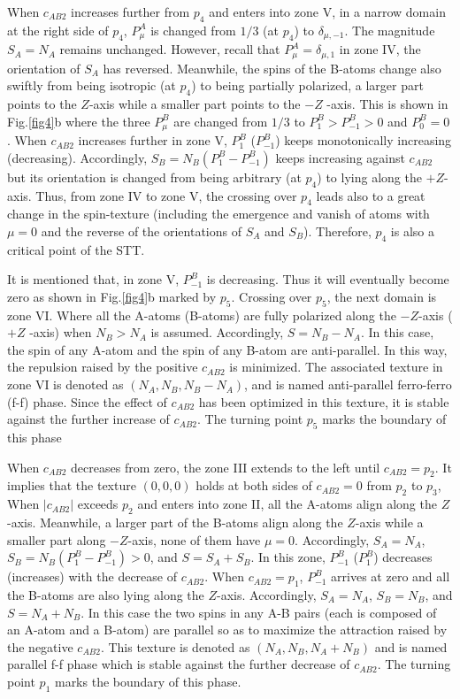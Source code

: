 \documentclass[10pt]{wlscirep}
\begin{document}
When $c_{AB2}$ increases further from $p_{4}$ and enters into
zone V, in a narrow domain at the right side of $p_{4}$, $%
P_{\mu }^{A}$ is changed from $1/3$ (at $p_{4}$) to $\delta
_{\mu ,-1}$. The magnitude $S_{A}=N_{A}$ remains unchanged. However, recall
that $P_{\mu }^{A}=\delta _{\mu ,1}$ in zone IV, the orientation of $S_{A}$
has reversed. Meanwhile, the spins of the B-atoms change also swiftly from
being isotropic (at $p_{4}$) to being partially polarized, a
larger part points to the $Z$-axis while a smaller part points to the $-Z$%
-axis. This is shown in Fig.\ref{fig4}b where the three $P_{\mu }^{B}$ are
changed from $1/3$ to $P_{1}^{B}>P_{-1}^{B}>0$ and $P_{0}^{B}=0$. When $%
c_{AB2}$ increases further in zone V, $P_{1}^{B}$ ($P_{-1}^{B}$) keeps
monotonically increasing (decreasing). Accordingly, $%
S_{B}=N_{B}(P_{1}^{B}-P_{-1}^{B})$ keeps increasing against $c_{AB2}$ but
its orientation is changed from being arbitrary (at $p_{4}$)
to lying along the $+Z$-axis. Thus, from zone IV to zone V, the crossing
over $p_{4}$ leads also to a great change in the spin-texture
(including the emergence and vanish of atoms with $\mu =0$ and the reverse
of the orientations of $S_{A}$ and $S_{B}$). Therefore, $p%
_{4} $ is also a critical point of the STT.

It is mentioned that, in zone V, $P_{-1}^{B}$ is decreasing. Thus it will
eventually become zero as shown in Fig.\ref{fig4}b marked by $p_{5}$.
Crossing over $p_{5}$, the next domain is zone VI.
Where all the A-atoms (B-atoms) are fully polarized along the $-Z$-axis ($+Z$%
-axis) when $N_{B}>N_{A}$ is assumed. Accordingly, $S=N_{B}-N_{A}$. In this
case, the spin of any A-atom and the spin of any B-atom are anti-parallel.
In this way, the repulsion raised by the positive $c_{AB2}$ is minimized.
The associated texture in zone VI is denoted as $(N_{A},N_{B},N_{B}-N_{A})$,
and is named anti-parallel ferro-ferro (f-f) phase. Since the effect of $%
c_{AB2}$ has been optimized in this texture, it is stable against the
further increase of $c_{AB2}$. The turning point $p_{5}$
marks the boundary of this phase

When $c_{AB2}$ decreases from zero, the zone III extends to the left until $%
c_{AB2}=p_{2}$. It implies that the texture $(0,0,0)$ holds
at both sides of $c_{AB2}=0$ from $p_{2}$ to $p%
_{3}$, When $|c_{AB2}|$ exceeds $p_{2}$ and enters into zone
II, all the A-atoms align along the $Z$-axis. Meanwhile, a larger part of
the B-atoms align along the $Z$-axis while a smaller part along $-Z$-axis,
none of them have $\mu =0$. Accordingly, $S_{A}=N_{A}$, $%
S_{B}=N_{B}(P_{1}^{B}-P_{-1}^{B})>0$, and $S=S_{A}+S_{B}$. In this zone, $%
P_{-1}^{B}$ ($P_{1}^{B}$) decreases (increases) with the decrease of $c_{AB2}
$. When $c_{AB2}=p_{1}$, $P_{-1}^{B}$ arrives at zero and all
the B-atoms are also lying along the $Z$-axis. Accordingly, $S_{A}=N_{A}$, $%
S_{B}=N_{B}$, and $S=N_{A}+N_{B}$. In this case the two spins in any A-B
pairs (each is composed of an A-atom and a B-atom) are parallel so as to
maximize the attraction raised by the negative $c_{AB2}$. This texture is
denoted as $(N_{A},N_{B},N_{A}+N_{B})$ and is named parallel f-f phase which
is stable against the further decrease of $c_{AB2}$. The turning point
$p_{1}$ marks the boundary of this phase.
\end{document}
